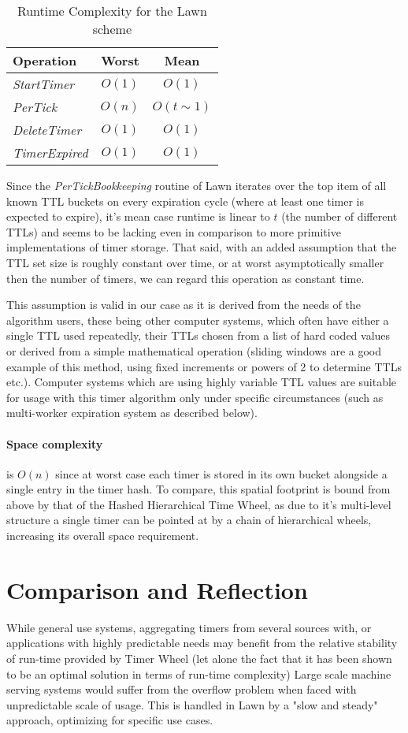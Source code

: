 \documentclass[twocolumn,a4paper]{article}
\newcommand{\advcomplexity}[9]{
\begin{table}[h!]
	\begin{center}
		\begin{tabular}{l|c|c}
			\textbf{Operation} & \textbf{Worst} & \textbf{Mean} \\
			\hline
			\textit{StartTimer} & $O(#1)$ & $O(#2)$ \\
			\textit{PerTick} & $O(#3)$ & $O(#4)$ \\
			\textit{DeleteTimer} & $O(#5)$ & $O(#6)$ \\
			\textit{TimerExpired} & $O(#7)$ & $O(#8)$ \\
		\end{tabular}
		\caption{Runtime Complexity for #9 scheme}
		\label{tab:table1}
	\end{center}
\end{table}
}
\begin{document}
\advcomplexity{1}{1}{n}{t\sim1}{1}{1}{1}{1}{the Lawn}

Since the \textit{PerTickBookkeeping} routine of Lawn iterates over the top item of all known TTL buckets on every expiration cycle (where at least one timer is expected to expire), it's mean case runtime is linear to $t$ (the number of different TTLs) and seems to be lacking even in comparison to more primitive implementations of timer storage. That said, with an added assumption that the TTL set size is roughly constant over time, or at worst asymptotically smaller then the number of timers, we can regard this operation as constant time.

This assumption is valid in our case as it is derived from the needs of the algorithm users, these being other computer systems, which often have either a single TTL used repeatedly, their TTLs chosen from a list of hard coded values or derived from a simple mathematical operation (sliding windows are a good example of this method, using fixed increments or powers of 2 to determine TTLs etc.). Computer systems which are using highly variable TTL values are suitable for usage with this timer algorithm only under specific circumstances (such as multi-worker expiration system as described below).


\paragraph{Space complexity} is $O(n)$ since at worst case each timer is stored in its own bucket alongside a single entry in the timer hash. To compare, this spatial footprint is bound from above by that of the Hashed Hierarchical Time Wheel, as due to it's multi-level structure a single timer can be pointed at by a chain of hierarchical wheels, increasing its overall space requirement.

\section{Comparison and Reflection}
While general use systems, aggregating timers from several sources with, or applications with highly predictable needs may benefit from the relative stability of run-time provided by Timer Wheel (let alone the fact that it has been shown to be an optimal solution in terms of run-time complexity) Large scale machine serving systems would suffer from the overflow problem when faced with unpredictable scale of usage. This is handled in Lawn by a "slow and steady" approach, optimizing for specific use cases.
\end{document}
